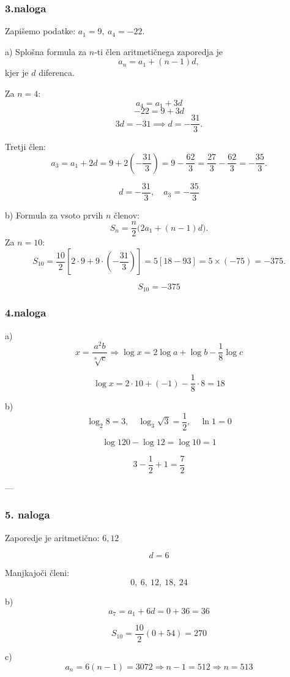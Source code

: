 \documentclass[a4paper,12pt]{letter}
\begin{document}
\subsubsection{3.naloga }

Zapišemo podatke:  
\( a_1 = 9,\ a_4 = -22 \).  


a)  
Splošna formula za \(n\)-ti člen aritmetičnega zaporedja je  
\[
a_n = a_1 + (n-1)d,
\]  
kjer je \(d\) diferenca.

Za \(n=4\):  
\[
a_4 = a_1 + 3d
\]
\[
-22 = 9 + 3d
\]
\[
3d = -31 \implies d = -\frac{31}{3}.
\]

Tretji člen:  
\[
a_3 = a_1 + 2d = 9 + 2\left(-\frac{31}{3}\right) = 9 - \frac{62}{3} = \frac{27}{3} - \frac{62}{3} = -\frac{35}{3}.
\]

\[
\boxed{d = -\frac{31}{3},\quad a_3 = -\frac{35}{3}}
\]

b) 
Formula za vsoto prvih \(n\) členov:  
\[
S_n = \frac{n}{2} \big( 2a_1 + (n-1)d \big).
\]
Za \(n=10\):  
\[
S_{10} = \frac{10}{2} \left[ 2\cdot 9 + 9\cdot \left(-\frac{31}{3}\right) \right]
= 5 \left[ 18 - 93 \right]
= 5 \times (-75) = -375.
\]

\[
\boxed{S_{10} = -375}
\]



\subsubsection{4.naloga}
a) 
\[
x=\frac{a^2b}{\sqrt[8]{c}}
\Rightarrow \log x=2\log a+\log b-\frac{1}{8}\log c
\]

\[
\log x=2\cdot10+(-1)-\frac{1}{8}\cdot8=18
\]

b)
\[
\log_2 8=3,\quad \log_3\sqrt{3}=\frac12,\quad \ln 1=0
\]

\[
\log 120-\log 12=\log 10=1
\]

\[
3-\frac12+1=\frac{7}{2}
\]

---

\subsubsection{5. naloga}

Zaporedje je aritmetično: $6,12$

\[
d=6
\]

Manjkajoči členi:
\[
0,\ 6,\ 12,\ 18,\ 24
\]

b) 
\[
a_7=a_1+6d=0+36=36
\]

\[
S_{10}=\frac{10}{2}(0+54)=270
\]

c)
\[
a_n=6(n-1)=3072
\Rightarrow n-1=512
\Rightarrow n=513
\]
\end{document}
